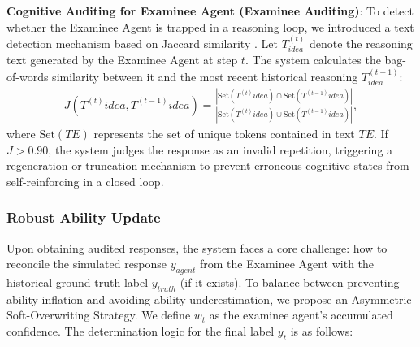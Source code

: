 \textbf{Cognitive Auditing for Examinee Agent (Examinee Auditing)}: To detect whether the Examinee Agent is trapped in a reasoning loop, we introduced a text detection mechanism based on Jaccard similarity \cite{nguyen2025enhancing}. Let $T^{(t)}_{idea}$ denote the reasoning text generated by the Examinee Agent at step $t$. The system calculates the bag-of-words similarity between it and the most recent historical reasoning $T^{(t-1)}_{idea}$:
\begin{align}
    J(T^{(t)}{idea}, T^{(t-1)}{idea}) = \frac{|\text{Set}(T^{(t)}{idea}) \cap \text{Set}(T^{(t-1)}{idea})|}{|\text{Set}(T^{(t)}{idea}) \cup \text{Set}(T^{(t-1)}{idea})|},
\end{align}
where $\text{Set}(TE)$ represents the set of unique tokens contained in text $TE$. If $J > 0.90$, the system judges the response as an invalid repetition, triggering a regeneration or truncation mechanism to prevent erroneous cognitive states from self-reinforcing in a closed loop.











\subsubsection{Robust Ability Update}
Upon obtaining audited responses, the system faces a core challenge: how to reconcile the simulated response $y_{agent}$ from the Examinee Agent with the historical ground truth label $y_{truth}$ (if it exists). To balance between preventing ability inflation and avoiding ability underestimation, we propose an Asymmetric Soft-Overwriting Strategy. We define $w_t$ as the examinee agent's accumulated confidence. The determination logic for the final label $y_t$ is as follows: 


